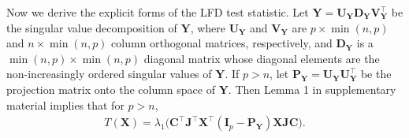 \documentclass[12pt]{article} %
\newcommand{\bX}{\mathbf{X}}
\newcommand{\bP}{\mathbf{P}}
\newcommand{\bY}{\mathbf{Y}}
\newcommand{\bJ}{\mathbf{J}}
\newcommand{\bC}{\mathbf{C}}
\newcommand{\bI}{\mathbf{I}}
\newcommand{\bU}{\mathbf{U}}
\newcommand{\bD}{\mathbf{D}}
\newcommand{\bV}{\mathbf{V}}
\theoremstyle{definition}
\begin{document}
Now we derive the explicit forms of the LFD test statistic. 
Let $\bY=\bU_{\bY}\bD_{\bY}\bV_{\bY}^\top$ be the singular value decomposition of $\bY$, where $\bU_{\bY}$ and $\bV_{\bY}$ are $p\times \min(n,p)$ and $n \times \min(n,p)$ column orthogonal matrices, respectively, and $\bD_{\bY}$ is a $\min(n,p)\times \min(n,p)$ diagonal matrix whose diagonal elements are the non-increasingly ordered singular values of $\bY$.
If $p>n$, let $\bP_{\bY}=\bU_{\bY}\bU_{\bY}^\top$ be the projection matrix onto the column space of $\bY$.
Then Lemma 1 in supplementary material implies that for $p>n$,
\begin{equation}\label{statisticForm1}
\begin{aligned}
    T(\bX)
    =\lambda_{1}\big(\bC^\top\bJ^\top\bX^\top (\bI_p-
    \bP_{\bY}
    )\bX\bJ\bC\big).
\end{aligned}
\end{equation}
\end{document}
